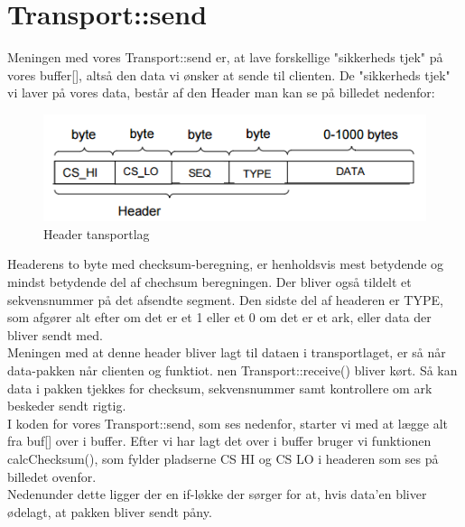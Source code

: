 \graphicspath{{Chapters/Mikrofonmontering/}}

\chapter{Transport::send}

Meningen med vores Transport::send er, at lave forskellige "sikkerheds tjek" på vores buffer[], altså den data vi ønsker at sende til clienten. De "sikkerheds tjek" vi laver på vores data, består af den Header man kan se på billedet nedenfor:\\
\begin{figure}[H]
	\centering
	\includegraphics[width = 300 pt]{Img/header.PNG}
	\caption{Header tansportlag}
	\label{fig:konceptbillede}
\end{figure}

Headerens to byte med checksum-beregning, er henholdsvis mest betydende og mindst betydende del af chechsum beregningen. Der bliver også tildelt et sekvensnummer på det afsendte segment. Den sidste del af headeren er TYPE, som afgører alt efter om det er et 1 eller et 0 om det er et ark, eller data der bliver sendt med.\\
Meningen med at denne header bliver lagt til dataen i transportlaget, er så når data-pakken når clienten og funktiot. 
nen Transport::receive() bliver kørt. Så kan data i pakken tjekkes for checksum, sekvensnummer samt kontrollere om ark beskeder sendt rigtig.\\
I koden for vores Transport::send, som ses nedenfor, starter vi med at lægge alt fra buf[] over i buffer. Efter vi har lagt det over i buffer bruger vi funktionen calcChecksum(), som fylder pladserne CS HI og CS LO i headeren som ses på billedet ovenfor. \\
Nedenunder dette ligger der en if-løkke der sørger for at, hvis data'en bliver ødelagt, at pakken bliver sendt påny.


